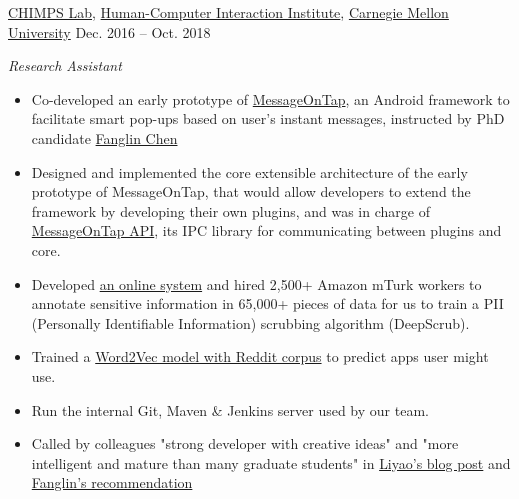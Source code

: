 \documentclass[hidelinks__VERSION__]{adamyi-cv}
\begin{document}
\begin{entrylist}


\entry
{\href{http://cmuchimps.org/}{CHIMPS Lab}, \href{https://www.hcii.cmu.edu/}{Human-Computer Interaction Institute}, \href{https://www.cmu.edu/}{Carnegie Mellon University}}
{Dec. 2016 -- Oct. 2018}
{\emph{Research Assistant}
\begin{itemize}
\item Co-developed an early prototype of \href{https://github.com/MessageOnTap}{MessageOnTap}, an Android framework to facilitate smart pop-ups based on user's instant messages, instructed by PhD candidate \href{mailto:fanglin@cmu.edu}{Fanglin Chen}
\item Designed and implemented the core extensible architecture of the early prototype of MessageOnTap, that would allow developers to extend the framework by developing their own plugins, and was in charge of \href{https://github.com/MessageOnTap/MessageOnTap_API}{MessageOnTap API}, its IPC library for communicating between plugins and core.
\item Developed \href{https://github.com/adamyi/CrowdAnnotator}{an online system} and hired 2,500+ Amazon mTurk workers to annotate sensitive information in 65,000+ pieces of data for us to train a PII (Personally Identifiable Information) scrubbing algorithm (DeepScrub).
\item Trained a \href{https://github.com/adamyi/Word2Vec_Reddit}{Word2Vec model with Reddit corpus} to predict apps user might use.
\item Run the internal Git, Maven \& Jenkins server used by our team.
\item Called by colleagues "strong developer with creative ideas" and "more intelligent and mature than many graduate students" in \href{https://web.archive.org/web/20190612011924/https://webcache.googleusercontent.com/search?q=cache:bhkkXtbnDPQJ:https://gaoliyao.github.io/report2017.html&hl=en}{Liyao's blog post} and \href{https://drive.google.com/file/d/1uW6ZahNYufCw7_nEwLBAYFibuD5-7JBd/view}{Fanglin's recommendation}
\end{itemize}}


\end{entrylist}

\end{document}
